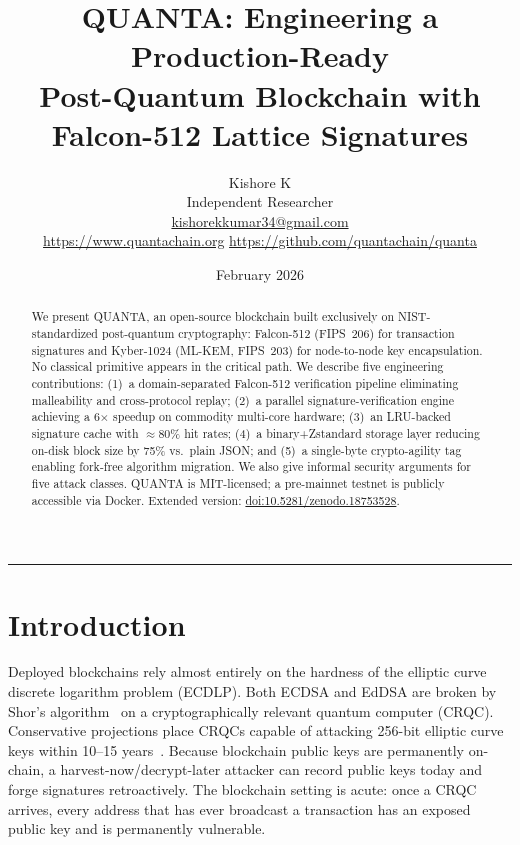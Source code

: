 \documentclass[11pt,a4paper]{article}
\begin{document}
\title{\textbf{QUANTA: Engineering a Production-Ready\\
Post-Quantum Blockchain with Falcon-512 Lattice Signatures}}

\author{
  Kishore K\\
  \small Independent Researcher\\
  \small \href{mailto:kishorekkumar34@gmail.com}{kishorekkumar34@gmail.com}\\
  \small \url{https://www.quantachain.org} \quad
  \url{https://github.com/quantachain/quanta}
}

\date{February 2026}
\maketitle
\thispagestyle{empty}

\begin{abstract}
We present QUANTA, an open-source blockchain built exclusively on
NIST-standardized post-quantum cryptography: Falcon-512 (FIPS~206) for
transaction signatures and Kyber-1024 (ML-KEM, FIPS~203) for node-to-node
key encapsulation. No classical primitive appears in the critical path.
We describe five engineering contributions: (1)~a domain-separated
Falcon-512 verification pipeline eliminating malleability and cross-protocol
replay; (2)~a parallel signature-verification engine achieving a 6$\times$
speedup on commodity multi-core hardware; (3)~an LRU-backed signature cache
with $\approx$80\% hit rates; (4)~a binary+Zstandard storage layer reducing
on-disk block size by 75\% vs.\ plain JSON; and (5)~a single-byte
crypto-agility tag enabling fork-free algorithm migration. We also give
informal security arguments for five attack classes. QUANTA is MIT-licensed;
a pre-mainnet testnet is publicly accessible via Docker.
Extended version: \href{https://doi.org/10.5281/zenodo.18753528}{doi:10.5281/zenodo.18753528}.
\end{abstract}

\hrule
\vspace{0.8em}

\section{Introduction}

Deployed blockchains rely almost entirely on the hardness of the elliptic
curve discrete logarithm problem (ECDLP). Both ECDSA and EdDSA are broken
by Shor's algorithm~\cite{shor1994} on a cryptographically relevant quantum
computer (CRQC). Conservative projections place CRQCs capable of attacking
256-bit elliptic curve keys within 10--15 years~\cite{mosca2018}. Because
blockchain public keys are permanently on-chain, a harvest-now/decrypt-later
attacker can record public keys today and forge signatures retroactively.
The blockchain setting is acute: once a CRQC arrives, every address that has
ever broadcast a transaction has an exposed public key and is permanently
vulnerable.
\end{document}
